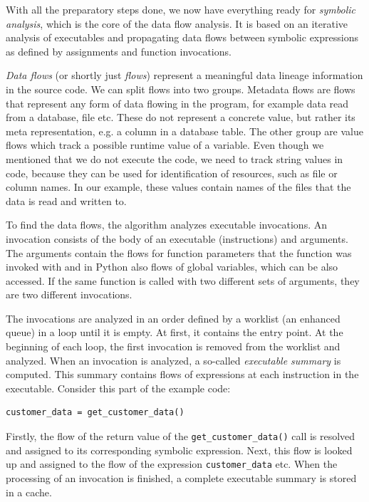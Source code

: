 With all the preparatory steps done, we now have everything ready for \textit{symbolic analysis}, which is the core of the data flow analysis. It is based on an iterative analysis of executables and propagating data flows between symbolic expressions as defined by assignments and function invocations.
\par
\textit{Data flows} (or shortly just \textit{flows}) represent a meaningful data lineage information in the source code. We can split flows into two groups. Metadata flows are flows that represent any form of data flowing in the program, for example data read from a database, file etc. These do not represent a concrete value, but rather its meta representation, e.g. a column in a database table. The other group are value flows which track a possible runtime value of a variable. Even though we mentioned that we do not execute the code, we need to track string values in code, because they can be used for identification of resources, such as file or column names. In our example, these values contain names of the files that the data is read and written to.
\par
To find the data flows, the algorithm analyzes executable invocations. An invocation consists of the body of an executable (instructions) and arguments. The arguments contain the flows for function parameters that the function was invoked with and in Python also flows of global variables, which can be also accessed. If the same function is called with two different sets of arguments, they are two different invocations.
\par
The invocations are analyzed in an order defined by a worklist (an enhanced queue) in a loop until it is empty. At first, it contains the entry point. At the beginning of each loop, the first invocation is removed from the worklist and analyzed. When an invocation is analyzed, a so-called \textit{executable summary} is computed. This summary contains flows of expressions at each instruction in the executable. Consider this part of the example code:
\begin{verbatim}
customer_data = get_customer_data()
\end{verbatim}
Firstly, the flow of the return value of the \texttt{get\_customer\_data()} call is resolved and assigned to its corresponding symbolic expression. Next, this flow is looked up and assigned to the flow of the expression \texttt{customer\_data} etc. When the processing of an invocation is finished, a complete executable summary is stored in a cache.
\par
